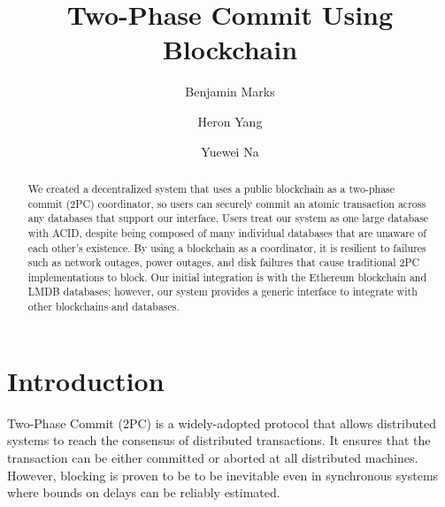 \documentclass[11pt,sigplan,screen,nonacm]{acmart}
\begin{document}
\title{Two-Phase Commit Using Blockchain}

\author{Benjamin Marks}

\author{Heron Yang}

\author{Yuewei Na}

\begin{abstract}
  We created a decentralized system that uses a public blockchain as a two-phase commit (2PC) coordinator, so users can securely commit an atomic transaction across any databases that support our interface. Users treat our system as one large database with ACID, despite being composed of many individual databases that are unaware of each other’s existence. By using a blockchain as a coordinator, it is resilient to failures such as network outages, power outages, and disk failures that cause traditional 2PC implementations to block. Our initial integration is with the Ethereum blockchain and LMDB databases; however, our system provides a generic interface to integrate with other blockchains and databases.
\end{abstract}


\begin{teaserfigure}
\end{teaserfigure}

\maketitle


\section{Introduction}
Two-Phase Commit (2PC) is a widely-adopted protocol that allows distributed systems to reach the consensus of distributed transactions. It ensures that the transaction can be either committed or aborted at all distributed machines. However, blocking is proven \cite{skeen1981nonblocking} to be to be inevitable even in synchronous systems where bounds on delays can be reliably estimated. 
\end{document}

